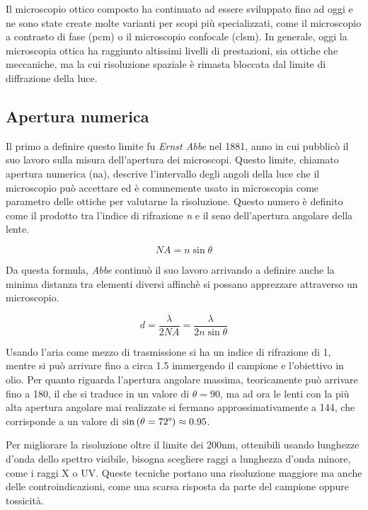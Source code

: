 \documentclass[../main.tex]{subfiles}
\begin{document}
Il microscopio ottico composto ha continuato ad essere sviluppato fino ad oggi e ne sono state create molte varianti per scopi più specializzati, come il microscopio a contrasto di fase (\acrshort{pcm})\cite{zernike_1955} o il microscopio confocale (\acrshort{clsm})\cite{pawley_2006}. In generale, oggi la microscopia ottica ha raggiunto altissimi livelli di prestazioni, sia ottiche che meccaniche, ma la cui risoluzione spaziale è rimasta bloccata dal limite di diffrazione della luce.

\subsection{Apertura numerica}

Il primo a definire questo limite fu \textit{Ernst Abbe} nel 1881, anno in cui pubblicò il suo lavoro sulla misura dell'apertura dei microscopi.\cite{abbe_1881} Questo limite, chiamato apertura numerica (\acrshort{na}), descrive l'intervallo degli angoli della luce che il microscopio può accettare ed è comunemente usato in microscopia come parametro delle ottiche per valutarne la risoluzione. Questo numero è definito come il prodotto tra l'indice di rifrazione \textit{n} e il seno dell'apertura angolare della lente.

\begin{equation}
	NA=n\sin\theta
\end{equation}

Da questa formula, \textit{Abbe} continuò il suo lavoro arrivando a definire anche la minima distanza tra elementi diversi affinchè si possano apprezzare attraverso un microscopio.\cite{abbe_1882}

\begin{equation}
d=\frac{\lambda}{2NA}=\frac{\lambda}{2n\sin\theta}
\end{equation}

Usando l'aria come mezzo di trasmissione si ha un indice di rifrazione di 1, mentre si può arrivare fino a circa 1.5 immergendo il campione e l'obiettivo in olio. Per quanto riguarda l'apertura angolare massima,  teoricamente può arrivare fino a 180\degree, il che si traduce in un valore di $\theta=90$\degree, ma ad ora le lenti con la più alta apertura angolare mai realizzate si fermano approssimativamente a 144\degree, che corrisponde a un valore di $\sin\left(\theta=72\degree\right) \approx 0.95$.\cite{leica_aperture}

Per migliorare la risoluzione oltre il limite dei 200nm, ottenibili usando lunghezze d'onda dello spettro visibile, bisogna scegliere raggi a lunghezza d'onda minore, come i raggi X o UV. Queste tecniche portano una risoluzione maggiore ma anche delle controindicazioni, come una scarsa risposta da parte del campione oppure tossicità.
\end{document}

